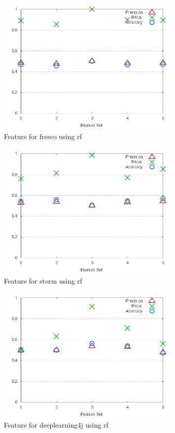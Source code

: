 \begin{figure}[!ht]
    \centering
        \includegraphics[width=0.8\textwidth]{images/rf/test_3/fresco_sample_range}
        \caption{Feature for fresco using \gls{rf}}
        \label{fig:test_3_fresco_rf}
\end{figure}

\begin{figure}[!ht]
    \centering
        \includegraphics[width=0.8\textwidth]{images/rf/test_3/storm_sample_range}
        \caption{Feature for storm using \gls{rf}}
        \label{fig:test_3_storm_rf}
\end{figure}

\begin{figure}[!ht]
    \centering
        \includegraphics[width=0.8\textwidth]{images/rf/test_3/deeplearning4j_sample_range}
    \caption{Feature for deeplearning4j using \gls{rf}}
    \label{fig:test_3_deeplearning4j_rf}
\end{figure}

